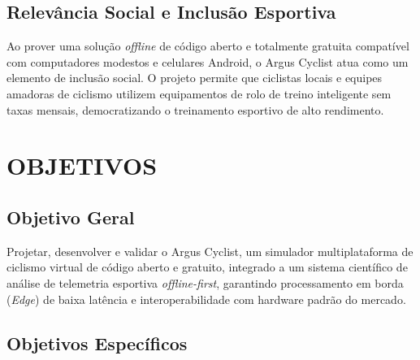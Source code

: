 \documentclass[
    a4paper,
    12pt,
    oneside,
    english,
    brazil,
    chapter=TITLE,
    section=TITLE,
]{abntex2}
\begin{document}
\section{Relevância Social e Inclusão Esportiva}
\label{sec:relevancia-social}

Ao prover uma solução \textit{offline} de código aberto e totalmente gratuita compatível com computadores modestos e celulares Android, o Argus Cyclist atua como um elemento de inclusão social. O projeto permite que ciclistas locais e equipes amadoras de ciclismo utilizem equipamentos de rolo de treino inteligente sem taxas mensais, democratizando o treinamento esportivo de alto rendimento.

\chapter{OBJETIVOS}
\label{sec:objetivos}

\section{Objetivo Geral}
\label{sec:objective-geral}

Projetar, desenvolver e validar o Argus Cyclist, um simulador multiplataforma de ciclismo virtual de código aberto e gratuito, integrado a um sistema científico de análise de telemetria esportiva \textit{offline-first}, garantindo processamento em borda (\textit{Edge}) de baixa latência e interoperabilidade com hardware padrão do mercado.

\section{Objetivos Específicos}
\label{sec:objetivos-especificos}
\end{document}
